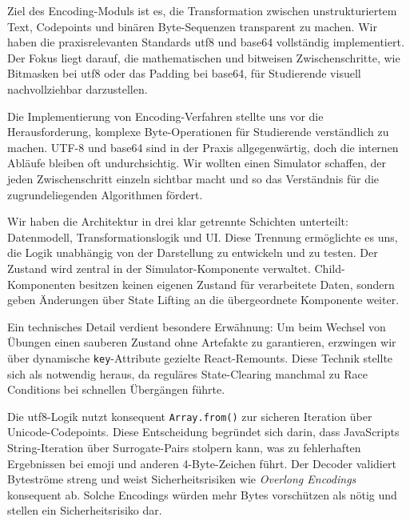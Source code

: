 
Ziel des Encoding-Moduls ist es, die Transformation zwischen unstrukturiertem Text, Codepoints und binären Byte-Sequenzen transparent zu machen. Wir haben die praxisrelevanten Standards \gls{utf8} und \gls{base64} vollständig implementiert. Der Fokus liegt darauf, die mathematischen und bitweisen Zwischenschritte, wie Bitmasken bei \gls{utf8} oder das Padding bei \gls{base64}, für Studierende visuell nachvollziehbar darzustellen.


Die Implementierung von Encoding-Verfahren stellte uns vor die Herausforderung, komplexe Byte-Operationen für Studierende verständlich zu machen. UTF-8 und \gls{base64} sind in der Praxis allgegenwärtig, doch die internen Abläufe bleiben oft undurchsichtig. Wir wollten einen Simulator schaffen, der jeden Zwischenschritt einzeln sichtbar macht und so das Verständnis für die zugrundeliegenden Algorithmen fördert.


Wir haben die Architektur in drei klar getrennte Schichten unterteilt: Datenmodell, Transformationslogik und UI. Diese Trennung ermöglichte es uns, die Logik unabhängig von der Darstellung zu entwickeln und zu testen. Der Zustand wird zentral in der Simulator-Komponente verwaltet. Child-Komponenten besitzen keinen eigenen Zustand für verarbeitete Daten, sondern geben Änderungen über State Lifting an die übergeordnete Komponente weiter.

Ein technisches Detail verdient besondere Erwähnung: Um beim Wechsel von Übungen einen sauberen Zustand ohne Artefakte zu garantieren, erzwingen wir über dynamische \texttt{key}-Attribute gezielte React-Remounts. Diese Technik stellte sich als notwendig heraus, da reguläres State-Clearing manchmal zu Race Conditions bei schnellen Übergängen führte.

Die \gls{utf8}-Logik nutzt konsequent \texttt{Array.from()} zur sicheren Iteration über Unicode-Codepoints. Diese Entscheidung begründet sich darin, dass JavaScripts String-Iteration über Surrogate-Pairs stolpern kann, was zu fehlerhaften Ergebnissen bei emoji und anderen 4-Byte-Zeichen führt. Der Decoder validiert Byteströme streng und weist Sicherheitsrisiken wie \textit{Overlong Encodings} konsequent ab. Solche Encodings würden mehr Bytes vorschützen als nötig und stellen ein Sicherheitsrisiko dar.

